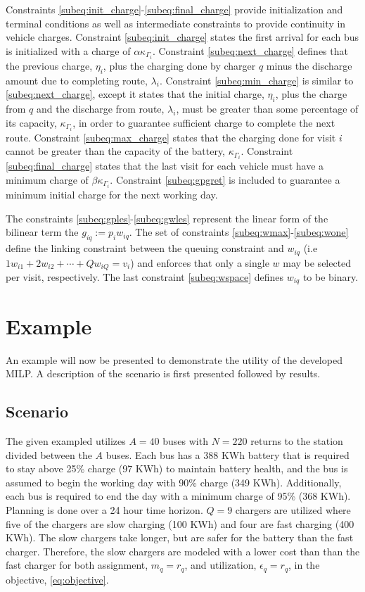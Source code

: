 \documentclass[letterpaper, 10pt, conference]{IEEEtran}
\begin{document}
Constraints \eqref{subeq:init_charge}-\eqref{subeq:final_charge} provide initialization and terminal conditions as well as intermediate constraints to provide continuity in vehicle charges. Constraint \eqref{subeq:init_charge} states the first arrival for each bus is initialized with a charge of $\alpha \kappa_{\Gamma_i}$. Constraint \eqref{subeq:next_charge} defines that the previous charge, $\eta_i$, plus the charging done by charger $q$ minus the discharge amount due to completing route, $\lambda_i$. Constraint \eqref{subeq:min_charge} is similar to \eqref{subeq:next_charge}, except it states that the initial charge, $\eta_i$, plus the charge from $q$ and the discharge from route, $\lambda_i$, must be greater than some percentage of its capacity, $\kappa_{\Gamma_i}$, in order to guarantee sufficient charge to complete the next route. Constraint \eqref{subeq:max_charge} states that the charging done for visit $i$ cannot be greater than the capacity of the battery, $\kappa_{\Gamma_i}$. Constraint \eqref{subeq:final_charge} states that the last visit for each vehicle must have a minimum charge of $\beta \kappa_{\Gamma_i}$. Constraint \eqref{subeq:gpgret} is included to guarantee a minimum initial charge for the next working day.

The constraints \eqref{subeq:gples}-\eqref{subeq:gwles} represent the linear form of the bilinear term the $g_{iq} := p_i w_{iq}$. The set of constraints \eqref{subeq:wmax}-\eqref{subeq:wone} define the linking constraint between the queuing constraint and $w_{iq}$ (i.e $1w_{i1} + 2w_{i2} + \cdots + Qw_{iQ} = v_i$) and enforces that only a single $w$ may be selected per visit, respectively. The last constraint \eqref{subeq:wspace} defines $w_{iq}$ to be binary.

\section{Example}
\label{sec:example}

An example will now be presented to demonstrate the utility of the developed MILP. A description of the scenario is first presented followed by results.

\subsection{Scenario}
The given exampled utilizes $A = 40$ buses with $N = 220$ returns to the station divided between the $A$ buses. Each bus has a 388 KWh battery that is required to stay above 25\% charge (97 KWh) to maintain battery health, and the bus is assumed to begin the working day with 90\% charge (349 KWh). Additionally, each bus is required to end the day with a minimum charge of 95\% (368 KWh). Planning is done over a 24 hour time horizon. $Q = 9$ chargers are utilized where five of the chargers are slow charging (100 KWh) and four are fast charging (400 KWh). The slow chargers take longer, but are safer for the battery than the fast charger. Therefore, the slow chargers are modeled with a lower cost than than the fast charger for both assignment, $m_q = r_q$, and utilization, $\epsilon_q = r_q$, in the objective, \eqref{eq:objective}.
\end{document}

